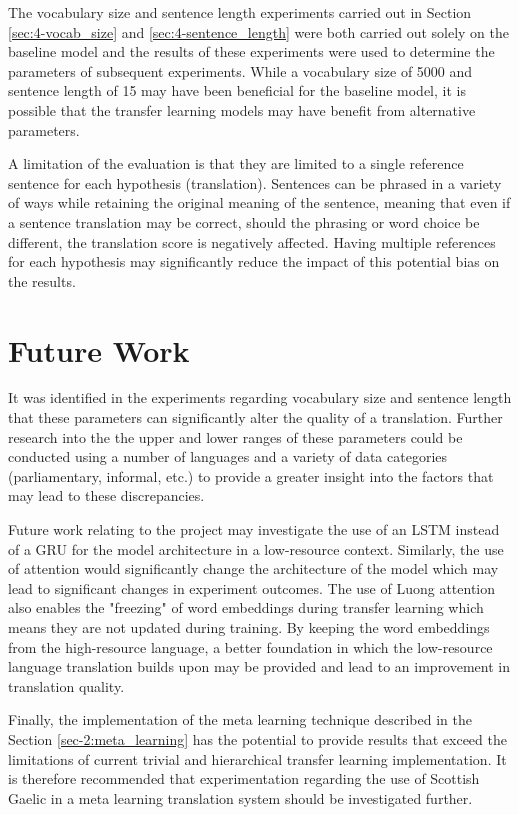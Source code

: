 The vocabulary size and sentence length experiments carried out in Section \ref{sec:4-vocab_size} and \ref{sec:4-sentence_length} were both carried out solely on the baseline model and the results of these experiments were used to determine the parameters of subsequent experiments. While a vocabulary size of 5000 and sentence length of 15 may have been beneficial for the baseline model, it is possible that the transfer learning models may have benefit from alternative parameters.

A limitation of the evaluation is that they are limited to a single reference sentence for each hypothesis (translation). Sentences can be phrased in a variety of ways while retaining the original meaning of the sentence, meaning that even if a sentence translation may be correct, should the phrasing or word choice be different, the translation score is negatively affected. Having multiple references for each hypothesis may significantly reduce the impact of this potential bias on the results.



\section{Future Work}

It was identified in the experiments regarding vocabulary size and sentence length that these parameters can significantly alter the quality of a translation. Further research into the the upper and lower ranges of these parameters could be conducted using a number of languages and a variety of data categories (parliamentary, informal, etc.) to provide a greater insight into the factors that may lead to these discrepancies.

Future work relating to the project may investigate the use of an \acrshort{LSTM} instead of a \acrshort{GRU} for the model architecture in a low-resource context. Similarly, the use of \cite{luong_effective_2015} attention would significantly change the architecture of the model which may lead to significant changes in experiment outcomes. The use of Luong attention also enables the "freezing" of word embeddings during transfer learning which means they are not updated during training. By keeping the word embeddings from the high-resource language, a better foundation in which the low-resource language translation builds upon may be provided and lead to an improvement in translation quality.

Finally, the implementation of the meta learning technique described in the Section \ref{sec-2:meta_learning} has the potential to provide results that exceed the limitations of current trivial and hierarchical transfer learning implementation. It is therefore recommended that experimentation regarding the use of Scottish Gaelic in a meta learning translation system should be investigated further.

